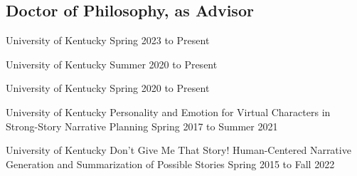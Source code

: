 \documentclass{cv}
\begin{document}
\subsection*{Doctor of Philosophy, as Advisor}
\begin{etaremune}[itemsep=0pt,parsep=0pt]
	\item {}
		{University of Kentucky}
		{}
		{Spring 2023 to Present}
	\item {}
		{University of Kentucky}
		{}
		{Summer 2020 to Present}
	\item {}
		{University of Kentucky}
		{}
		{Spring 2020 to Present}
	\item {}
		{University of Kentucky}
		{Personality and Emotion for Virtual Characters in Strong-Story Narrative Planning}
		{Spring 2017 to Summer 2021}
	\item {}
		{University of Kentucky}
		{Don't Give Me That Story! Human-Centered Narrative Generation and Summarization of Possible Stories}
		{Spring 2015 to Fall 2022}
\end{etaremune}
\end{document}
